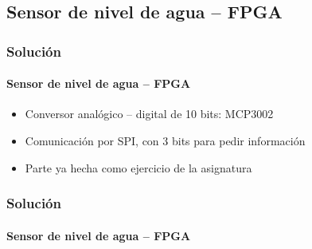 \documentclass[compress]{beamer}
\begin{document}
	\subsection{Sensor de nivel de agua -- FPGA}
		\begin{frame}
			\frametitle{Soluci\'on}
			\framesubtitle{Sensor de nivel de agua -- FPGA}
				\begin{itemize}
					\item
					{

						Conversor anal\'ogico -- digital de 10 bits: MCP3002

					}
					\item
					{

						Comunicaci\'on por SPI, con 3 bits para pedir informaci\'on

					}
					\item
					{

						Parte ya hecha como ejercicio de la asignatura

					}
				\end{itemize}
				\begin{figure}
				\end{figure}
 		\end{frame}
		\begin{frame}
			\frametitle{Soluci\'on}
			\framesubtitle{Sensor de nivel de agua -- FPGA}
				\begin{figure}
				\end{figure}
 		\end{frame}
\end{document}
